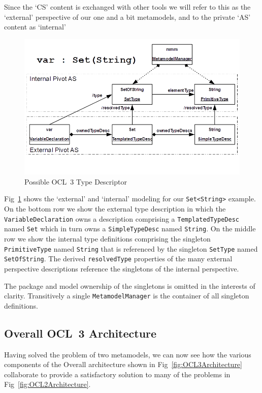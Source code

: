 \documentclass{jot}
\begin{document}
Since the `CS' content is exchanged with other tools we will refer to this as the `external' perspective of our one and a bit metamodels, and to the private `AS' content as `internal'

\begin{figure}
	\begin{center}
		\includegraphics[width=4.5in]{OCL3TypeDescriptor.png}
	\end{center}
	\vspace{-40pt}
	\caption{Possible OCL~3 Type Descriptor}
	\label{fig:OCL3TypeDescriptor}
\end{figure}

Fig~\ref{fig:OCL3TypeDescriptor} shows the `external' and `internal' modeling for our \verb$Set<String>$ example. On the bottom row we show the external type description in which the \verb$VariableDeclaration$ owns a description comprising a \verb$TemplatedTypeDesc$ named \verb$Set$ which in turn owns a \verb$SimpleTypeDesc$ named \verb$String$. On the middle row we show the internal type definitions comprising the singleton \verb$PrimitiveType$ named \verb$String$ that is referenced by the singleton \verb$SetType$ named \verb$SetOfString$. The  derived \verb$resolvedType$ properties of the many external perspective descriptions reference the singletons of the internal perspective.

The package and model ownership of the singletons is omitted in the interests of clarity. Transitively a single \verb$MetamodelManager$ is the container of all singleton definitions.

\subsection{Overall OCL~3 Architecture}

Having solved the problem of two metamodels, we can now see how the various components of the Overall architecture shown in Fig~\ref{fig:OCL3Architecture} collaborate to provide a satisfactory solution to many of the problems in Fig~\ref{fig:OCL2Architecture}. 
\end{document}
